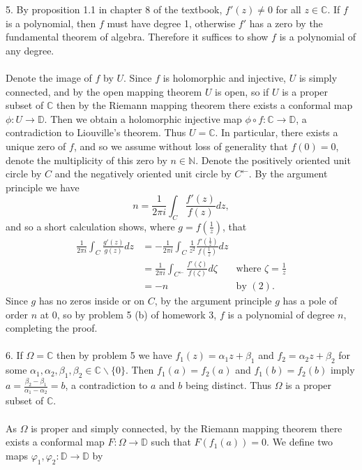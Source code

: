 \documentclass{article}
\newcommand{\N}{\mathbb{N}}
\newcommand{\C}{\mathbb{C}}
\newcommand{\D}{\mathbb{D}}
\begin{document}
5. By proposition 1.1 in chapter 8 of the textbook, $f'(z) \neq 0$ for all $z\in \C$. If $f$ is a polynomial, then $f$ must have degree 1, otherwise $f'$ has a zero by the fundamental theorem of algebra. Therefore it suffices to show $f$ is a polynomial of any degree. 
\\ \\
Denote the image of $f$ by $U$. Since $f$ is holomorphic and injective, $U$ is simply connected, and by the open mapping theorem $U$ is open, so if $U$ is a proper subset of $\C$ then by the Riemann mapping theorem there exists a conformal map $\phi: U \to \D$. Then we obtain a holomorphic injective map $\phi \circ f: \C \to \D$, a contradiction to Liouville's theorem. Thus $U = \C$. In particular, there exists a unique zero of $f$, and so we assume without loss of generality that $f(0) =0$, denote the multiplicity of this zero by $n \in \N$. Denote the positively oriented unit circle by $C$ and the negatively oriented unit circle by $C^{\leftarrow}$. By the argument principle we have
\begin{equation}
n = \frac{1}{2\pi i} \int_C \frac{f'(z)}{f(z)}dz,
\end{equation}
and so a short calculation shows, where $g = f(\frac{1}{z})$, that
\begin{align*}
    \frac{1}{2\pi i} \int_C \frac{g'(z)}{g(z)}dz &= -\frac{1}{2\pi i} \int_C \frac{1}{z^2} \frac{f'(\frac{1}{z})}{f(\frac{1}{z})}dz \\
    &= \frac{1}{2\pi i} \int_{C^{\leftarrow}} \frac{f'(\zeta)}{f(\zeta)}d\zeta &\text{where } \zeta = \frac{1}{z} \\
    &= -n &\text{by } (2).
\end{align*}
Since $g$ has no zeros inside or on $C$, by the argument principle $g$ has a pole of order $n$ at 0, so by problem 5 (b) of homework 3, $f$ is a polynomial of degree $n$, completing the proof. 
\\ \\
6. If $\Omega = \C$ then by problem 5 we have $f_1(z) = \alpha_1 z + \beta_1$ and $f_2 = \alpha_2 z + \beta_2 $ for some $\alpha_1,\alpha_2,\beta_1,\beta_2 \in \C \backslash \{0\}$. Then $f_1(a) = f_2(a)$ and $f_1(b)=f_2(b)$ imply $a = \frac{\beta_2-\beta_1}{\alpha_1-\alpha_2} = b$, a contradiction to $a$ and $b$ being distinct. Thus $\Omega$ is a proper subset of $\C$.
\\ \\
As $\Omega$ is proper and simply connected, by the Riemann mapping theorem there exists a conformal map $F: \Omega \to \D$ such that $F(f_1(a)) = 0$. We define two maps $\varphi_1, \varphi_2: \D \to \D$ by 
\end{document}
